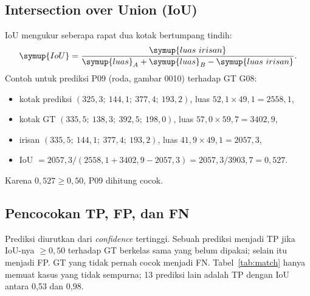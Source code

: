 \documentclass[12pt,a4paper]{article}
\begin{document}
\subsection{Intersection over Union (IoU)}
IoU mengukur seberapa rapat dua kotak bertumpang tindih:
\[
\symup{IoU} = \frac{\symup{luas\ irisan}}{\symup{luas}_A + \symup{luas}_B - \symup{luas\ irisan}}.
\]
Contoh untuk prediksi P09 (roda, gambar 0010) terhadap GT G08:
\begin{itemize}
\item kotak prediksi $(325{,}3;\ 144{,}1;\ 377{,}4;\ 193{,}2)$, luas $52{,}1 \times 49{,}1 = 2558{,}1$,
\item kotak GT $(335{,}5;\ 138{,}3;\ 392{,}5;\ 198{,}0)$, luas $57{,}0 \times 59{,}7 = 3402{,}9$,
\item irisan $(335{,}5;\ 144{,}1;\ 377{,}4;\ 193{,}2)$, luas $41{,}9 \times 49{,}1 = 2057{,}3$,
\item IoU $= 2057{,}3 / (2558{,}1 + 3402{,}9 - 2057{,}3) = 2057{,}3 / 3903{,}7 = 0{,}527$.
\end{itemize}
Karena $0{,}527 \geq 0{,}50$, P09 dihitung cocok.

\subsection{Pencocokan TP, FP, dan FN}
Prediksi diurutkan dari \textit{confidence} tertinggi. Sebuah prediksi menjadi TP jika IoU-nya $\geq 0{,}50$ terhadap GT berkelas sama yang belum dipakai; selain itu menjadi FP. GT yang tidak pernah cocok menjadi FN. Tabel~\ref{tab:match} hanya memuat kasus yang tidak sempurna; 13 prediksi lain adalah TP dengan IoU antara 0,53 dan 0,98.
\end{document}
